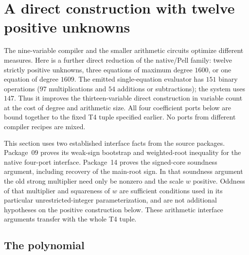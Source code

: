 \section{A direct construction with twelve positive unknowns}
\label{sec:radical-twelve}

The nine-variable compiler and the smaller arithmetic circuits optimize
different measures.  Here is a further direct reduction
of the native/Pell family: twelve strictly positive unknowns, three
equations of maximum degree $1600$, or one equation of degree $1609$.
The emitted single-equation evaluator has $151$ binary operations
($97$ multiplications and $54$ additions or subtractions); the system
uses $147$.  Thus it improves the thirteen-variable direct construction
in variable count at the cost of degree and arithmetic size.
All four coefficient ports below are bound together to the fixed T4 tuple
specified earlier.  No ports from different compiler recipes are mixed.

This section uses two established interface facts from the source
packages.  Package~09 proves its weak-sign bootstrap and weighted-root
inequality for the native four-port interface.  Package~14 proves the
signed-core soundness argument, including recovery of the main-root sign.
In that soundness argument the old strong multiplier need only be nonzero
and the scale $w$ positive.  Oddness of that multiplier and squareness of
$w$ are sufficient conditions used in its particular unrestricted-integer
parameterization, and are not additional hypotheses on the positive
construction below.  These arithmetic interface arguments transfer with
the whole T4 tuple.

\subsection{The polynomial}

